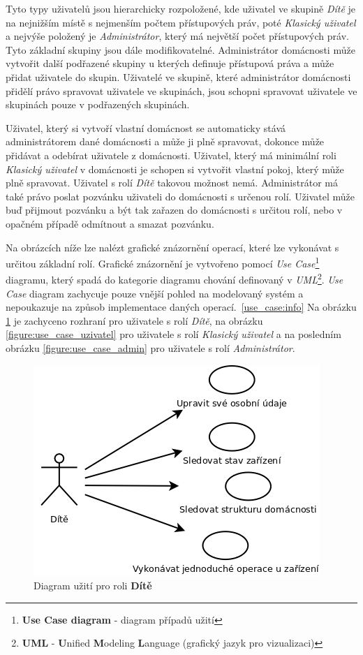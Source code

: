 Tyto typy uživatelů jsou hierarchicky rozpoložené, kde uživatel ve skupině \emph{Dítě} je na nejnižším místě s nejmenším počtem přístupových práv, poté \emph{Klasický uživatel} a nejvýše položený je \emph{Administrátor}, který má největší počet přístupových práv.
Tyto základní skupiny jsou dále modifikovatelné. Administrátor domácnosti může vytvořit další podřazené skupiny u kterých definuje přístupová práva a může přidat uživatele do skupin.
Uživatelé ve skupině, které administrátor domácnosti přidělí právo spravovat uživatele ve skupinách, jsou schopni spravovat uživatele ve skupinách pouze v podřazených skupinách.

Uživatel, který si vytvoří vlastní domácnost se automaticky stává administrátorem dané domácnosti a může ji plně spravovat, dokonce může přidávat a odebírat uživatele z domácnosti.
Uživatel, který má minimální roli \emph{Klasický uživatel} v domácnosti je schopen si vytvořit vlastní pokoj, který může plně spravovat. Uživatel s rolí \emph{Dítě} takovou možnost nemá.
Administrátor má také právo poslat pozvánku uživateli do domácnosti s určenou rolí.
\newline
Uživatel může buď přijmout pozvánku a být tak zařazen do domácnosti s určitou rolí, nebo v opačném případě odmítnout a smazat pozvánku.
\newline

Na obrázcích níže lze nalézt grafické znázornění operací, které lze vykonávat s určitou základní rolí.
Grafické znázornění je vytvořeno pomocí \emph{Use Case}\footnote{\textbf{Use Case diagram} - diagram případů užití} diagramu, který spadá do kategorie diagramu chování definovaný v \emph{UML}\footnote{\textbf{UML} - \textbf{U}nified \textbf{M}odeling \textbf{L}anguage (grafický jazyk pro vizualizaci)}.
\emph{Use Case} diagram zachycuje pouze vnější pohled na modelovaný systém a nepoukazuje na způsob implementace daných operací.~\ref{use_case:info}
Na obrázku \ref{figure:use_case_dite} je zachyceno rozhraní pro uživatele s rolí \emph{Dítě}, na obrázku \ref{figure:use_case_uzivatel} pro uživatele s rolí \emph{Klasický uživatel} a na posledním obrázku \ref{figure:use_case_admin} pro uživatele s rolí \emph{Administrátor}.

\begin{figure}[hbt]
  \centering
  \includegraphics[width=0.4 \linewidth]{obrazky-figures/useCaseChild.png}
  \caption{Diagram užití pro roli \textbf{Dítě}}
  \label{figure:use_case_dite}
\end{figure}

